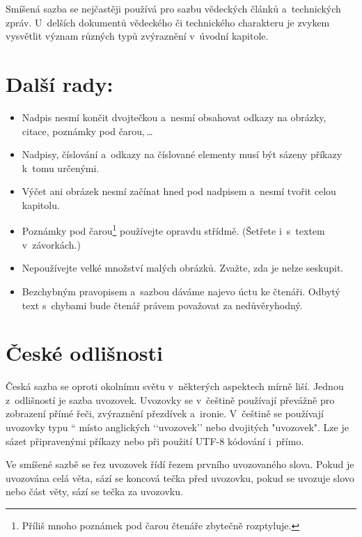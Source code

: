 \documentclass[a4paper, twocolumn, 10pt]{article}[23.02.2018]
\newcommand{\myuv}[1]{\quotedblbase #1\textquotedblleft}
\begin{document}
Smíšená sazba se nejčastěji používá pro sazbu vědeckých článků a~technických zpráv. U~delších dokumentů vědeckého či technického charakteru je zvykem vysvětlit význam různých typů zvýraznění v~úvodní kapitole.

\section{Další rady:}
\label{b}
\begin{itemize}
\item Nadpis nesmí končit dvojtečkou a~nesmí obsahovat odkazy na obrázky, citace, poznámky pod čarou,\,\dots

\item Nadpisy, číslování a~odkazy na číslované elementy musí být sázeny příkazy k~tomu určenými.

\item Výčet ani obrázek nesmí začínat hned pod nadpisem a~nesmí tvořit celou kapitolu.

\item Poznámky pod čarou\footnote{Příliš mnoho poznámek pod čarou čtenáře zbytečně rozptyluje.} používejte opravdu střídmě. (Šetřete i~s~textem v~závorkách.)

\item Nepoužívejte velké množství malých obrázků. Zvažte, zda je nelze seskupit.

\item Bezchybným pravopisem a~sazbou dáváme najevo úctu ke čtenáři. Odbytý text s~chybami bude čtenář právem považovat za nedůvěryhodný.
\end{itemize}

\section{České odlišnosti}

Česká sazba se oproti okolnímu světu v~některých aspektech mírně liší. Jednou z~odlišností je sazba uvozovek. Uvozovky se v~češtině používají převážně pro zobrazení přímé řeči, zvýraznění přezdívek a~ironie. V~češtině se používají uvozovky typu \myuv{9966} místo anglických ‘‘uvozovek’’ nebo dvojitých "uvozovek". Lze je sázet připravenými příkazy nebo při použití UTF-8 kódování i~přímo.

Ve smíšené sazbě se řez uvozovek řídí řezem prvního uvozovaného slova. Pokud je uvozována celá věta, sází se koncová tečka před uvozovku, pokud se uvozuje slovo nebo část věty, sází se tečka za uvozovku.
\end{document}
